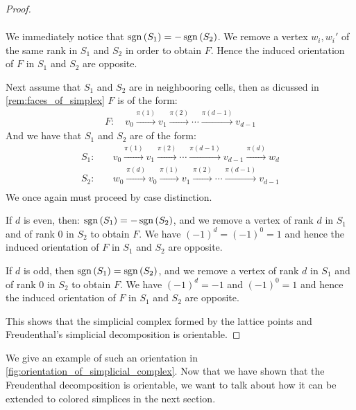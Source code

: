 \begin{proof}
\begin{case}{1}
\begin{align*}
		\end{align*}
		We immediately notice that $\operatorname{sgn}\left(S_1\right) = - \operatorname{sgn}\left(S_2\right)$. We remove a vertex $w_i, w_i'$ of the same rank in $S_1$ and $S_2$ in order to obtain $F$. Hence the induced orientation of $F$ in $S_1$ and $S_2$ are opposite.
	\end{case}
	\begin{case}{2}
		Next assume that $S_1$ and $S_2$ are in neighbooring cells, then as dicussed in \cref{rem:faces_of_simplex} $F$ is of the form:
		\begin{align*}
			F: \quad v_0 \xrightarrow{\pi(1)} v_1 \xrightarrow{\pi(2)} \cdots  \xrightarrow{\pi(d-1)} v_{d-1}
		\end{align*}
		And we have that $S_1$ and $S_2$ are of the form:
		\begin{align*}
			S_1: & \quad v_0 \xrightarrow{\pi(1)} v_1 \xrightarrow{\pi(2)} \cdots \xrightarrow{\pi(d-1)} v_{d-1} \xrightarrow{\pi(d)} w_d \\
			S_2: & \quad w_0 \xrightarrow{\pi(d)} v_0 \xrightarrow{\pi(1)} v_1 \xrightarrow{\pi(2)} \cdots \xrightarrow{\pi(d-1)} v_{d-1} \\
		\end{align*}
		We once again must proceed by case distinction.
		\begin{case}{2.1}
			If $d$ is even, then: $\operatorname{sgn}\left(S_1\right) = - \operatorname{sgn}\left(S_2\right)$, and we remove a vertex of rank $d$ in $S_1$ and of rank $0$ in $S_2$ to obtain $F$. We have $(-1)^d = (-1)^0 = 1$ and hence the induced orientation of $F$ in $S_1$ and $S_2$ are opposite.
		\end{case}
		\begin{case}{2.2}
			If $d$ is odd, then $\operatorname{sgn}\left(S_1\right) = \operatorname{sgn}\left(S_2\right)$, and we remove a vertex of rank $d$ in $S_1$ and of rank $0$ in $S_2$ to obtain $F$. We have $(-1)^d = -1$ and $(-1)^0 = 1$ and hence the induced orientation of $F$ in $S_1$ and $S_2$ are opposite.
		\end{case}
	\end{case}
	This shows that the simplicial complex formed by the lattice points and Freudenthal's simplicial decomposition is orientable.
\end{proof}

We give an example of such an orientation in \cref{fig:orientation_of_simplicial_complex}. Now that we have shown that the Freudenthal decomposition is orientable, we want to talk about how it can be extended to colored simplices in the next section.

